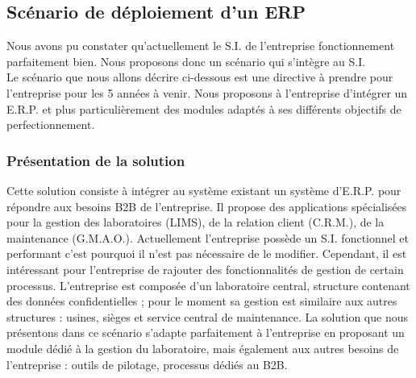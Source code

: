 \newpage
\subsection{Scénario de déploiement d'un ERP}
Nous avons pu constater qu'actuellement le S.I. de l'entreprise fonctionnement parfaitement bien. Nous proposons donc un scénario qui s'intègre au S.I. \\
Le scénario que nous allons décrire ci-dessous est une directive à prendre pour l'entreprise pour les 5 années à venir. Nous proposons à l'entreprise d'intégrer un E.R.P. et plus particulièrement des modules adaptés à ses différents objectifs de perfectionnement.  
\subsubsection{Présentation de la solution}
Cette solution consiste à intégrer au système existant un système d'E.R.P. pour répondre aux besoins B2B de l'entreprise. Il propose des applications spécialisées pour la gestion des laboratoires (LIMS), de la relation client (C.R.M.), de la maintenance (G.M.A.O.). Actuellement l'entreprise possède un S.I. fonctionnel et performant c'est pourquoi il n'est pas nécessaire de le modifier. Cependant, il est intéressant pour l'entreprise de rajouter des fonctionnalités de gestion de certain processus. L'entreprise est composée d'un laboratoire central, structure contenant des données confidentielles ; pour le moment sa gestion est similaire aux autres structures : usines, sièges et service central de maintenance. La solution que nous présentons dans ce scénario s'adapte parfaitement à l'entreprise en proposant un module dédié à la gestion du laboratoire, mais également aux autres besoins de l'entreprise : outils de pilotage, processus dédiés au B2B.   
